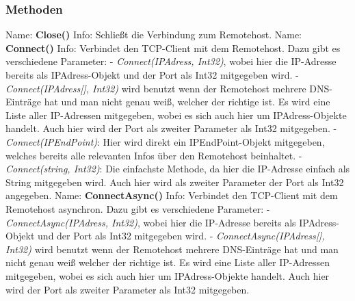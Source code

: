 \subsubsection{Methoden}
Name: \textbf{Close()}
\newline
Info: Schließt die Verbindung zum Remotehost.
\newline
\newline
Name: \textbf{Connect()}
\newline
Info: Verbindet den TCP-Client mit dem Remotehost. Dazu gibt es verschiedene Parameter:
\newline \tab \newline
- \textit{Connect(IPAdress, Int32)}, wobei hier die IP-Adresse bereits als IPAdress-Objekt und der Port als Int32 mitgegeben wird.
\newline \tab \newline
- \textit{Connect(IPAdress[], Int32)} wird benutzt wenn der Remotehost mehrere DNS-Einträge hat und man nicht genau weiß, welcher der richtige ist. Es wird eine Liste aller IP-Adressen mitgegeben, wobei es sich auch hier um IPAdress-Objekte handelt. Auch hier wird der Port als zweiter Parameter als Int32 mitgegeben.
\newline \tab \newline
- \textit{Connect(IPEndPoint)}: Hier wird direkt ein IPEndPoint-Objekt mitgegeben, welches bereits alle relevanten Infos über den Remotehost beinhaltet.
\newline \tab \newline
- \textit{Connect(string, Int32)}: Die einfachste Methode, da hier die IP-Adresse einfach als String mitgegeben wird. Auch hier wird als zweiter Parameter der Port als Int32 angegeben.
\newline
\newline
Name: \textbf{ConnectAsync()}
\newline
Info: Verbindet den TCP-Client mit dem Remotehost asynchron. Dazu gibt es verschiedene Parameter:
\newline \tab \newline
- \textit{ConnectAsync(IPAdress, Int32)}, wobei hier die IP-Adresse bereits als IPAdress-Objekt und der Port als Int32 mitgegeben wird.
\newline \tab \newline
- \textit{ConnectAsync(IPAdress[], Int32)} wird benutzt wenn der Remotehost mehrere DNS-Einträge hat und man nicht genau weiß welcher der richtige ist. Es wird eine Liste aller IP-Adressen mitgegeben, wobei es sich auch hier um IPAdress-Objekte handelt. Auch hier wird der Port als zweiter Parameter als Int32 mitgegeben.
